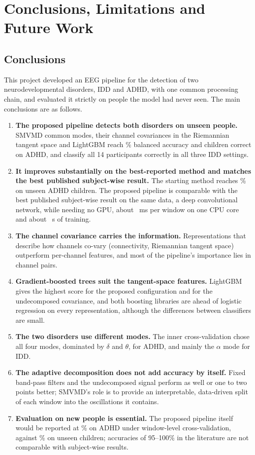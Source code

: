 \chapter{Conclusions, Limitations and Future Work}
\thispagestyle{empty}

\section{Conclusions}
This project developed an EEG pipeline for the detection of two neurodevelopmental disorders,
IDD and ADHD, with one common processing chain, and evaluated it strictly on people the model had
never seen. The main conclusions are as follows.

\begin{enumerate}
\item \textbf{The proposed pipeline detects both disorders on unseen people.} SMVMD common
      modes, their channel covariances in the Riemannian tangent space and LightGBM reach
      \% balanced accuracy and
       children correct on ADHD, and classify all 14 participants correctly
      in all three IDD settings.
\item \textbf{It improves substantially on the best-reported method and matches the best
      published subject-wise result.} The starting method reaches \% on unseen
      ADHD children. The proposed pipeline is comparable with the best published subject-wise
      result on the same data, a deep convolutional network, while needing no GPU, about
      ~ms per window on one CPU core and about ~s of training.
\item \textbf{The channel covariance carries the information.} Representations that describe
      how channels co-vary (connectivity, Riemannian tangent space) outperform per-channel
      features, and most of the pipeline's importance lies in channel pairs.
\item \textbf{Gradient-boosted trees suit the tangent-space features.} LightGBM gives the highest
      score for the proposed configuration and for the undecomposed covariance, and both
      boosting libraries are ahead of logistic regression on every representation, although the
      differences between classifiers are small.
\item \textbf{The two disorders use different modes.} The inner cross-validation chose all four
      modes, dominated by $\delta$ and $\theta$, for ADHD, and mainly the $\alpha$ mode for IDD.
\item \textbf{The adaptive decomposition does not add accuracy by itself.} Fixed band-pass
      filters and the undecomposed signal perform as well or one to two points better; SMVMD's
      role is to provide an interpretable, data-driven split of
      each window into the oscillations it contains.
\item \textbf{Evaluation on new people is essential.} The proposed pipeline itself would be
      reported at \% on ADHD under window-level cross-validation, against
      \% on unseen children; accuracies of 95--100\% in the literature are
      not comparable with subject-wise results.
\end{enumerate}


